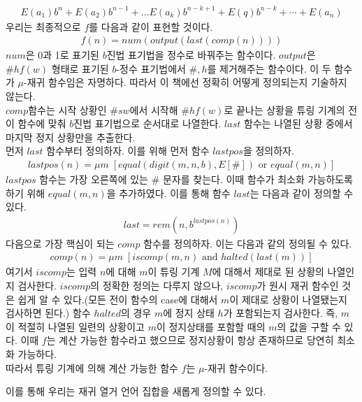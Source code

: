 \documentclass[b5paper, 11pt]{book}
\theoremstyle{definition}
\newenvironment{pf*}{\pushQED{\qed}\pf}
{\popQED\endpf}
\begin{document}
\begin{pf*}
    \begin{align*}
        E(a_1)b^n + E(a_2)b^{n-1} + \ldots E(a_k)b^{n-k+1} + E(q)b^{n-k} + \cdots + E(a_n)
    \end{align*}
    우리는 최종적으로 $f$를 다음과 같이 표현할 것이다.
    \begin{align*}
        f(n) = num(output(last(comp(n))))
    \end{align*}
    $num$은 0과 1로 표기된 $b$진법 표기법을 정수로 바꿔주는 함수이다.  $output$은 $\# h f(w)$ 형태로 표기된 $b$-정수 표기법에서 $\#, h$를 제거해주는 함수이다. 이 두 함수가 $\mu$-재귀 함수임은 자명하다. 따라서 이 책에선 정확히 어떻게 정의되는지 기술하지 않는다.\\ 
    $comp$함수는 시작 상황인 $\# s w$에서 시작해 $\# h f(w)$로 끝나는 상황을 튜링 기계의 전이 함수에 맞춰 $b$진법 표기법으로 순서대로 나열한다. $last$ 함수는 나열된 상황 중에서 마지막 정지 상황만을 추출한다. \\ 
    먼저 $last$ 함수부터 정의하자. 이를 위해 먼저 함수 $lastpos$을 정의하자.
    \begin{align*}
        lastpos(n)= \mu m \; [equal(digit(m,n,b),E[\#]) \text{ or } equal(m,n)]
    \end{align*} 
    $lastpos$ 함수는 가장 오른쪽에 있는 $\#$ 문자를 찾는다. 이때 함수가 최소화 가능하도록 하기 위해 $equal(m,n)$을 추가하였다. 이를 통해 함수 $last$는 다음과 같이 정의할 수 있다.
    \begin{align*}
        last = rem(n,b^{lastpos(n)})
    \end{align*}
    다음으로 가장 핵심이 되는 $comp$ 함수를 정의하자. 이는 다음과 같의 정의될 수 있다.
    \begin{align*}
        comp(n) = \mu m \; [iscomp(m,n) \text{ and } halted(last(m))]
    \end{align*}
    여기서 $iscomp$는 입력 $n$에 대해 $m$이 튜링 기계 $M$에 대해서 제대로 된 상황의 나열인지 검사한다. $iscomp$의 정확한 정의는 다루지 않으나, $iscomp$가 원시 재귀 함수인 것은 쉽게 알 수 있다.(모든 전이 함수의 case에 대해서 $m$이 제대로 상황이 나열됐는지 검사하면 된다.) 함수 $halted$의 경우 $m$에 정지 상태 $h$가 포함되는지 검사한다. 즉, $m$이 적절히 나열된 일련의 상황이고 $m$이 정지상태를 포함할 때의 $m$의 값을 구할 수 있다. 이때 $f$는 계산 가능한 함수라고 했으므로 정지상황이 항상 존재하므로 당연히 최소화 가능하다. \\ 
    따라서 튜링 기계에 의해 계산 가능한 함수 $f$는 $\mu$-재귀 함수이다. 
\end{pf*}
이를 통해 우리는 재귀 열거 언어 집합을 새롭게 정의할 수 있다.
\end{document}
